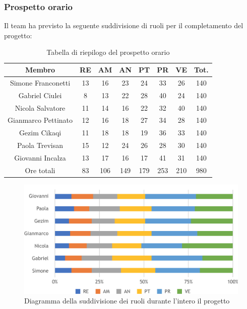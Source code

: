 \subsubsection{Prospetto orario}
Il team ha previsto la seguente suddivisione di ruoli per il completamento del progetto:
\begin{table}[h]
\caption{Tabella di riepilogo del prospetto orario}  
\begin{center}
\begin{tabular}{ |c|c|c|c|c|c|c|c|  }
 \hline
 Membro 		& RE 		& AM 		& AN 	& PT 	& PR 	& VE 	& Tot.\\
 \hline\hline
 Simone	Franconetti		& 13 		& 16			& 23 		& 24 		& 33 		& 26 		& 140\\
 Gabriel Ciulei		& 8 			& 13 		& 22 		& 28		& 40 		& 24 		& 140\\
 Nicola	Salvatore		& 11 		& 14 		& 16 		& 22 		& 32 		& 40 		& 140\\
 Gianmarco Pettinato		& 12 		& 16 		& 18 		& 27	 	& 34 		& 28 		& 140\\
 Gezim Cikaqi		& 11 		& 18 		& 18 		& 19 		& 36 		& 33	 	& 140\\
 Paola Trevisan		& 15 		& 12 		& 24 		& 26 		& 28 		& 30 		& 140\\
 Giovanni	Incalza	& 13 		& 17	 		& 16 		& 17 		& 41	 	& 31  		& 140\\
 \hline\hline
 Ore totali		& 83 	& 106		& 149 	& 179 	& 253 	& 210 	& 980\\
  \hline
\end{tabular}
\end{center}
\end{table}
\begin{figure}[h!]
	\includegraphics[width=\textwidth]{res/img/hip3}
	\caption{Diagramma della suddivisione dei ruoli durante l'intero il progetto}
\end{figure}

